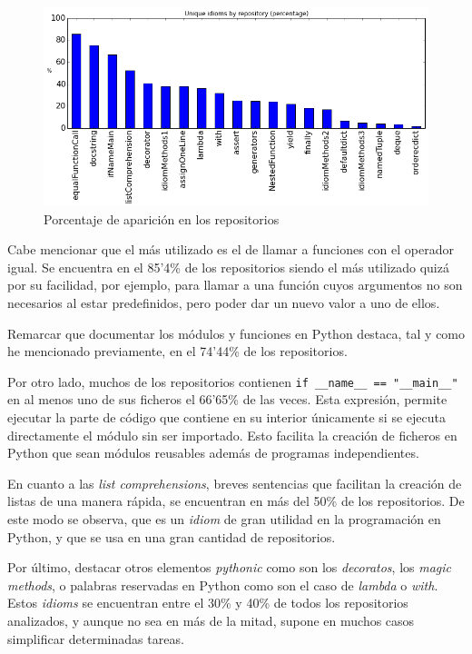 \documentclass[a4paper, 12pt]{book}
\begin{document}
\begin{figure}[!b]
\centering
\includegraphics[width=140mm]{img/graphs/percentage.png}
\caption{Porcentaje de aparición en los repositorios}
\label{fig:percentage_repos}
\end{figure}

Cabe mencionar que el más utilizado es el de llamar a funciones con el operador igual. Se encuentra en el 85'4\% de los repositorios siendo el más utilizado quizá por su facilidad, por ejemplo, para llamar a una función cuyos argumentos no son necesarios al estar predefinidos, pero poder dar un nuevo valor a uno de ellos.

Remarcar que documentar los módulos y funciones en Python destaca, tal y como he mencionado previamente, en el 74'44\% de los repositorios.

Por otro lado, muchos de los repositorios contienen \verb|if __name__ == "__main__"| en al menos uno de sus ficheros el 66'65\% de las veces. Esta expresión, permite ejecutar la parte de código que contiene en su interior únicamente si se ejecuta directamente el módulo sin ser importado. Esto facilita la creación de ficheros en Python que sean módulos reusables además de programas independientes.

En cuanto a las \textit{list comprehensions}, breves sentencias que facilitan la creación de listas de una manera rápida, se encuentran en más del 50\% de los repositorios. De este modo se observa, que es un \textit{idiom} de gran utilidad en la programación en Python, y que se usa en una gran cantidad de repositorios.

Por último, destacar otros elementos \textit{pythonic} como son los \textit{decoratos}, los \textit{magic methods}, o palabras reservadas en Python como son el caso de \textit{lambda} o \textit{with}. Estos \textit{idioms} se encuentran entre el 30\% y 40\% de todos los repositorios analizados, y aunque no sea en más de la mitad, supone en muchos casos simplificar determinadas tareas.
\end{document}
